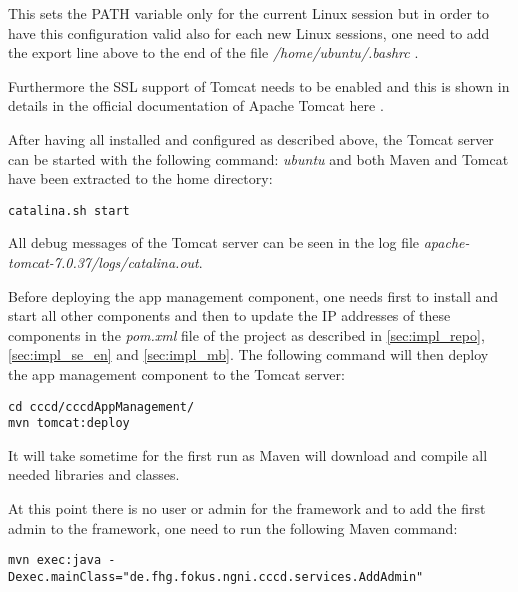\begin{itemize}
This sets the PATH variable only for the current Linux session but in order to have this configuration valid also for each new Linux sessions, one need to add the export line above to the end of the file \textit{/home/ubuntu/.bashrc} .

Furthermore the SSL support of Tomcat needs to be enabled and this is shown in details in the official documentation of Apache Tomcat here \cite{tomcat_ssl}.

\end{itemize}

After having all installed and configured as described above, the Tomcat server can be started with the following command:
\textit{ubuntu} and both Maven and Tomcat have been extracted to the home directory:
\begin{code}
\begin{verbatim}
catalina.sh start
\end{verbatim}
\end{code} 

All debug messages of the Tomcat server can be seen in the log file \textit{apache-tomcat-7.0.37/logs/catalina.out}. 

Before deploying the app management component, one needs first to install and start all other components and then to update the IP addresses of these components in the \textit{pom.xml} file of the project as described in \ref{sec:impl_repo}, \ref{sec:impl_se_en} and \ref{sec:impl_mb}. The following command will then deploy the app management component to the Tomcat server:
\begin{code}
\begin{verbatim}
cd cccd/cccdAppManagement/
mvn tomcat:deploy
\end{verbatim}
\end{code}

It will take sometime for the first run as Maven will download and compile all needed libraries and classes.

At this point there is no user or admin for the framework and to add the first admin to the framework, one need to run the following Maven command:

\begin{code}
\begin{verbatim}
mvn exec:java -Dexec.mainClass="de.fhg.fokus.ngni.cccd.services.AddAdmin"
\end{verbatim}
\end{code}

